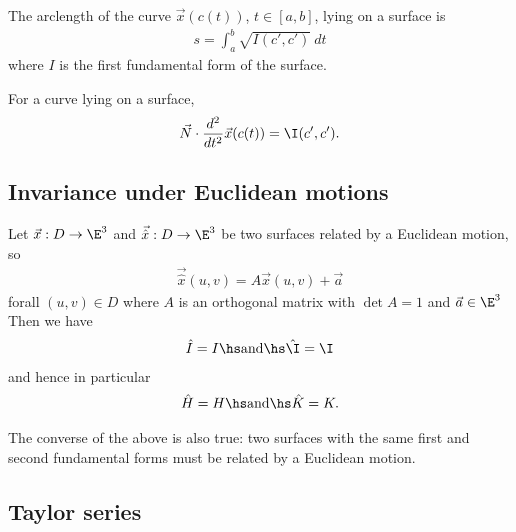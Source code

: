 \documentclass{article}
\begin{document}
\begin{proposition}
    The arclength of the curve $\vec x(c(t))$, $t\in[a,b]$, lying on a surface is 
    \begin{align*}
        s = \int_a^b \sqrt{I(c',c')}\:dt
    \end{align*}
    where $I$ is the first fundamental form of the surface.
\end{proposition}

\begin{proposition}
    For a curve lying on a surface,
    \begin{align*}
        \vec N\cdot \frac{d^2}{dt^2}\vec x(c(t)) = \I(c',c').
    \end{align*}
\end{proposition}

\subsection{Invariance under Euclidean motions}

\begin{theorem}
    Let $\vec x: D\to\E^3$ and $\vec{\hat x}:D\to\E^3$ be two surfaces related by a 
    Euclidean motion, so 
    \begin{align*}
        \vec{\hat x} (u,v) = A\vec x(u,v)+\vec a
    \end{align*}
    forall $(u,v)\in D$ where $A$ is an orthogonal matrix with $\det A=1$ and $\vec a\in\E^3$
    Then we have 
    \begin{align*}
        \hat I = I \hs \text{and} \hs \hat\I = \I
    \end{align*}
    and hence in particular
    \begin{align*}
        \hat H = H \hs \text{and} \hs \hat K = K.
    \end{align*}
\end{theorem}

\begin{theorem}
    The converse of the above is also true: two surfaces with the same first and second 
    fundamental forms must be related by a Euclidean motion.
\end{theorem}

\subsection{Taylor series}
\end{document}

